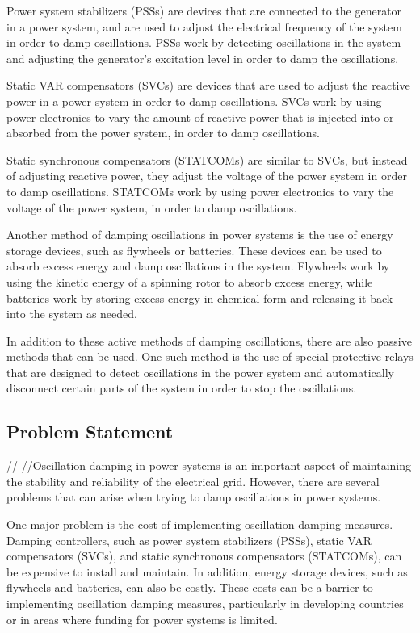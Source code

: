 \documentclass[12pt]{article}
\begin{document}
Power system stabilizers (PSSs) are devices that are connected to the generator in a power system, and are used to adjust the electrical frequency of the system in order to damp oscillations. PSSs work by detecting oscillations in the system and adjusting the generator's excitation level in order to damp the oscillations.

Static VAR compensators (SVCs) are devices that are used to adjust the reactive power in a power system in order to damp oscillations. SVCs work by using power electronics to vary the amount of reactive power that is injected into or absorbed from the power system, in order to damp oscillations.

Static synchronous compensators (STATCOMs) are similar to SVCs, but instead of adjusting reactive power, they adjust the voltage of the power system in order to damp oscillations. STATCOMs work by using power electronics to vary the voltage of the power system, in order to damp oscillations.

Another method of damping oscillations in power systems is the use of energy storage devices, such as flywheels or batteries. These devices can be used to absorb excess energy and damp oscillations in the system. Flywheels work by using the kinetic energy of a spinning rotor to absorb excess energy, while batteries work by storing excess energy in chemical form and releasing it back into the system as needed.

In addition to these active methods of damping oscillations, there are also passive methods that can be used. One such method is the use of special protective relays that are designed to detect oscillations in the power system and automatically disconnect certain parts of the system in order to stop the oscillations. 
\subsection{Problem Statement}//
//Oscillation damping in power systems is an important aspect of maintaining the stability and reliability of the electrical grid. However, there are several problems that can arise when trying to damp oscillations in power systems.

One major problem is the cost of implementing oscillation damping measures. Damping controllers, such as power system stabilizers (PSSs), static VAR compensators (SVCs), and static synchronous compensators (STATCOMs), can be expensive to install and maintain. In addition, energy storage devices, such as flywheels and batteries, can also be costly. These costs can be a barrier to implementing oscillation damping measures, particularly in developing countries or in areas where funding for power systems is limited.
\end{document}
